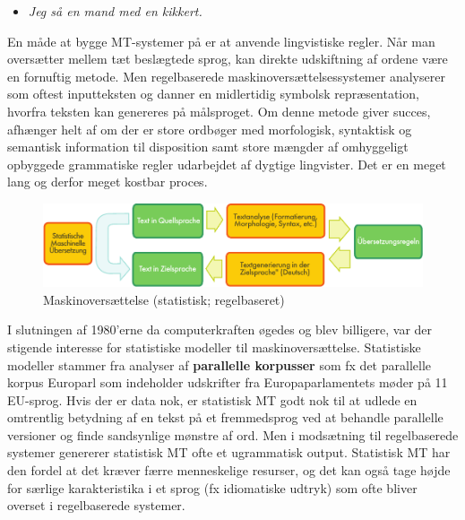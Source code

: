 \documentclass[]{../../metanetpaper}
\begin{document}
\begin{multicols}{2}
\begin{itemize}
\item {\it Jeg \mbox{s\aa} en mand med en kikkert.}
\end{itemize}

En m\aa de at bygge MT-systemer \mbox{p\aa} er at anvende lingvistiske regler. N\aa r man overs\ae tter mellem t\ae t besl\ae gtede sprog, kan direkte udskiftning af ordene v\ae re en fornuftig metode. Men regelbaserede maskinovers\ae ttelsessystemer analyserer som oftest inputteksten og danner en midlertidig symbolsk repr\ae sentation, hvorfra teksten kan genereres \mbox{p\aa} m\aa lsproget. Om denne metode giver succes, afh\ae nger helt af om der er store ordb\o ger med morfologisk, syntaktisk og semantisk information til disposition samt store m\ae ngder af omhyggeligt opbyggede grammatiske regler udarbejdet af dygtige lingvister. Det er en meget lang og derfor meget kostbar proces.

\begin{figure}[htb]
  \center
  \includegraphics[width=\textwidth]{../_media/german/machine_translation}
  \caption{Maskinovers\ae ttelse (statistisk; regelbaseret)}
  \label{fig:mtarch_de}
\end{figure}

I slutningen af 1980'erne da computerkraften \o gedes og blev billigere, var der stigende interesse for statistiske modeller til maskinovers\ae ttelse. Statistiske modeller stammer fra analyser af {\bf parallelle korpusser} som fx det parallelle korpus Europarl som indeholder udskrifter fra Europaparlamentets m\o der \mbox{p\aa} 11 EU-sprog. Hvis der er data nok, er statistisk MT godt nok til at udlede en omtrentlig betydning af en tekst \mbox{p\aa} et fremmedsprog ved at behandle parallelle versioner og finde sandsynlige m\o nstre af ord. Men i mods\ae tning til regelbaserede systemer genererer statistisk MT ofte et ugrammatisk output. Statistisk MT har den fordel at det kr\ae ver f\ae rre menneskelige resurser, og det kan \mbox{ogs\aa} tage h\o jde for s\ae rlige karakteristika i et sprog (fx idiomatiske udtryk) som ofte bliver overset i regelbaserede systemer. 


\end{multicols}
\end{document}

